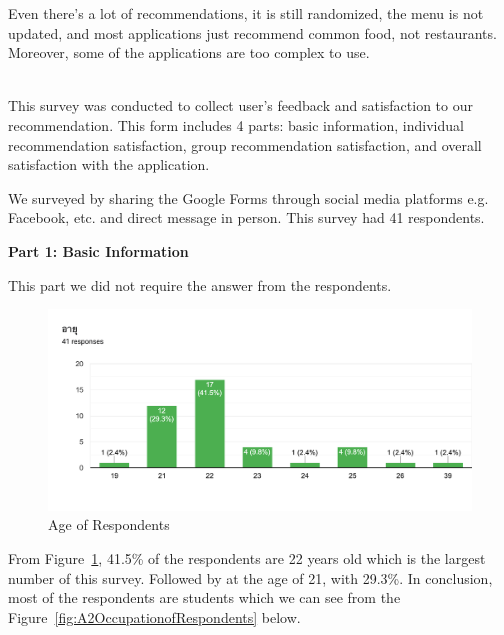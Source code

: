 \documentclass[12pt,oneside,openright,a4paper]{cpe-english-project}
\begin{document}
Even there’s a lot of recommendations, it is still randomized, the menu is not updated, and most applications just recommend common food, not restaurants. Moreover, some of the applications are too complex to use.


\setcounter{figure}{0}
 \\


This survey was conducted to collect user’s feedback and satisfaction to our recommendation. This form includes 4 parts: basic information, individual recommendation satisfaction, group recommendation satisfaction, and overall satisfaction with the application.

We surveyed by sharing the Google Forms through social media platforms e.g. Facebook, etc. and direct message in person. This survey had 41 respondents.

\textbf{Part 1: Basic Information}

This part we did not require the answer from the respondents.

\begin{figure}[H]\centering
\includegraphics[width=350pt]{./images/A2AgeofRespondents.png}
\caption{Age of Respondents}\label{fig:A2AgeofRespondents}
\end{figure}\vspace{-24pt}

From Figure~\ref{fig:A2AgeofRespondents}, 41.5\% of the respondents are 22 years old which is the largest number of this survey. Followed by at the age of 21, with 29.3\%. In conclusion, most of the respondents are students which we can see from the Figure~\ref{fig:A2OccupationofRespondents} below.
\end{document}
